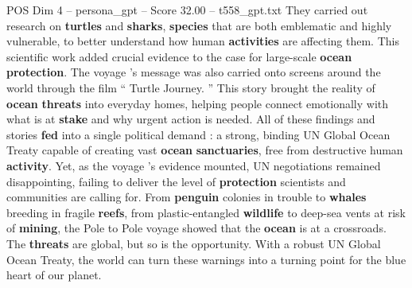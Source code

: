 \begin{textsample}{POS Dim 4 – persona\_gpt – Score 32.00 – t558\_gpt.txt}
They carried out research on \textbf{turtles} and \textbf{sharks}, \textbf{species} that are both emblematic and highly vulnerable, to better understand how human \textbf{activities} are affecting them.
This scientific work added crucial evidence to the case for large-scale \textbf{ocean} \textbf{protection}.
The voyage ’s message was also carried onto screens around the world through the film “ Turtle Journey. ” This story brought the reality of \textbf{ocean} \textbf{threats} into everyday homes, helping people connect emotionally with what is at \textbf{stake} and why urgent action is needed.
All of these findings and stories \textbf{fed} into a single political demand : a strong, binding UN Global Ocean Treaty capable of creating vast \textbf{ocean} \textbf{sanctuaries}, free from destructive human \textbf{activity}.
Yet, as the voyage ’s evidence mounted, UN negotiations remained disappointing, failing to deliver the level of \textbf{protection} scientists and communities are calling for.
From \textbf{penguin} colonies in trouble to \textbf{whales} breeding in fragile \textbf{reefs}, from plastic-entangled \textbf{wildlife} to deep-sea vents at risk of \textbf{mining}, the Pole to Pole voyage showed that the \textbf{ocean} is at a crossroads.
The \textbf{threats} are global, but so is the opportunity.
With a robust UN Global Ocean Treaty, the world can turn these warnings into a turning point for the blue heart of our planet.

\end{textsample}
